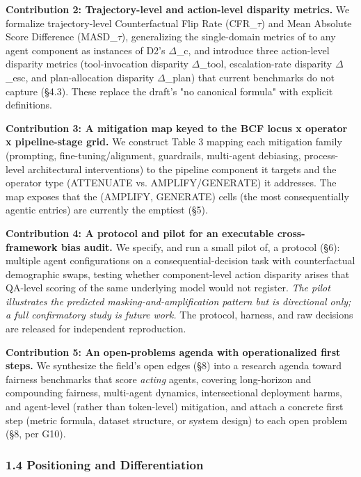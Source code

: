 \documentclass[10pt]{article}
\begin{document}
\textbf{Contribution 2: Trajectory-level and action-level disparity metrics.} We formalize trajectory-level Counterfactual Flip Rate (CFR\_$\tau$) and Mean Absolute Score Difference (MASD\_$\tau$), generalizing the single-domain metrics of \cite{mayilvaghanan2026counterfactual} to any agent component as instances of D2's $\Delta$\_c, and introduce three action-level disparity metrics (tool-invocation disparity $\Delta$\_tool, escalation-rate disparity $\Delta$\_esc, and plan-allocation disparity $\Delta$\_plan) that current benchmarks do not capture (\S{}4.3). These replace the draft's "no canonical formula" with explicit definitions.

\textbf{Contribution 3: A mitigation map keyed to the BCF locus x operator x pipeline-stage grid.} We construct Table 3 mapping each mitigation family (prompting, fine-tuning/alignment, guardrails, multi-agent debiasing, process-level architectural interventions) to the pipeline component it targets and the operator type (ATTENUATE vs. AMPLIFY/GENERATE) it addresses. The map exposes that the (AMPLIFY, GENERATE) cells (the most consequentially agentic entries) are currently the emptiest (\S{}5).

\textbf{Contribution 4: A protocol and pilot for an executable cross-framework bias audit.} We specify, and run a small pilot of, a protocol (\S{}6): multiple agent configurations on a consequential-decision task with counterfactual demographic swaps, testing whether component-level action disparity arises that QA-level scoring of the same underlying model would not register. \emph{The pilot illustrates the predicted masking-and-amplification pattern but is directional only; a full confirmatory study is future work.} The protocol, harness, and raw decisions are released for independent reproduction.

\textbf{Contribution 5: An open-problems agenda with operationalized first steps.} We synthesize the field's open edges (\S{}8) into a research agenda toward fairness benchmarks that score \emph{acting} agents, covering long-horizon and compounding fairness, multi-agent dynamics, intersectional deployment harms, and agent-level (rather than token-level) mitigation, and attach a concrete first step (metric formula, dataset structure, or system design) to each open problem (\S{}8, per G10).

\subsubsection*{1.4 Positioning and Differentiation}
\end{document}
